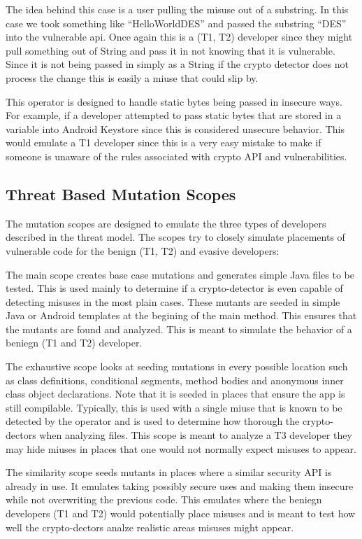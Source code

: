  The idea behind this case is a user pulling the misuse out of a substring. In this case we took something like “HelloWorldDES” and passed the substring “DES” into the vulnerable api. Once again this is a (T1, T2) developer since they might pull something out of String and pass it in not knowing that it is vulnerable. Since it is not being passed in simply as a String if the crypto detector does not process the change this is easily a miuse that could slip by.

 This operator is designed to handle static bytes being passed in insecure ways. For example, if a developer attempted to pass static bytes that are stored in a variable into Android Keystore since this is considered unsecure behavior. This would emulate a T1 developer since this is a very easy mistake to make if someone is unaware of the rules associated with crypto API and vulnerabilities.



\subsection{Threat Based Mutation Scopes}
\label{ch2:sec:scopes}

The mutation scopes are designed to emulate the three types of developers described in the threat model. The scopes try to closely simulate placements of vulnerable code for the benign (T1, T2) and evasive developers:

The main scope creates base case mutations and generates simple Java files to be tested. This is used mainly to determine if a crypto-detector is even capable of detecting misuses in the most plain cases. These mutants are seeded in simple Java or Android templates at the begining of the main method. This ensures that the mutants are found and analyzed. This is meant to simulate the behavior of a beniegn (T1 and T2) developer.

The exhaustive scope looks at seeding mutations in every possible location such as class definitions, conditional segments, method bodies and anonymous inner class object declarations. Note that it is seeded in places that ensure the app is still compilable. Typically, this is used with a single miuse that is known to be detected by the operator and is used to determine how thorough the crypto-dectors when analyzing files. This scope is meant to analyze a T3 developer they may hide miuses in places that one would not normally expect misuses to appear.

The similarity scope seeds mutants in places where a similar security API is already in use. It emulates taking possibly secure uses and making them insecure while not overwriting the previous code. This emulates where the beniegn developers (T1 and T2) would potentially place misuses and is meant to test how well the crypto-dectors analze realistic areas misuses might appear. 
